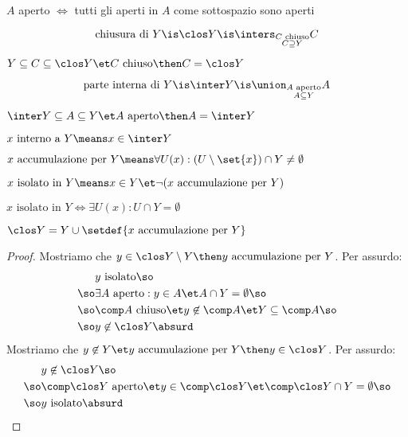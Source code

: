 \begin{prop}
$A$ aperto $\iff$ tutti gli aperti in $A$ come sottospazio sono aperti
\end{prop}

\begin{defn}
\[\text{chiusura di }Y\is\clos Y\is\inters_{\substack{C\text{ chiuso}\\C\supseteq Y}}C\]
\end{defn}

\begin{prop}
$Y\subseteq C\subseteq\clos Y\et C\text{ chiuso}\then C=\clos Y$
\end{prop}

\begin{defn}
\[\text{parte interna di }Y\is\inter Y\is\union_{\substack{A\text{ aperto}\\A\subseteq Y}}A\]
\end{defn}

\begin{prop}
$\inter Y\subseteq A\subseteq Y\et A\text{ aperto}\then A=\inter Y$
\end{prop}

\begin{defn}
$x\text{ interno a }Y\means x\in\inter Y$
\end{defn}

\begin{defn}
$x\text{ accumulazione per }Y\means\forall U(x):(U\setminus\set{x})\cap Y\neq\emptyset$
\end{defn}

\begin{defn}
$x\text{ isolato in }Y\means x\in Y\et\neg(x\text{ accumulazione per }Y)$
\end{defn}

\begin{prop}
$x\text{ isolato in }Y\iff\exists U(x):U\cap Y=\emptyset$
\end{prop}

\begin{lemma}
$\clos Y=Y\cup\setdef{x\text{ accumulazione per }Y}$
\end{lemma}
\begin{proof}
Mostriamo che $y\in\clos Y\setminus Y\then y\text{ accumulazione per }Y$. Per assurdo:
\begin{align*}
&y\text{ isolato}\so\\
\so&\exists A\text{ aperto}:y\in A\et A\cap Y=\emptyset\so\\
\so&\comp A\text{ chiuso}\et y\not\in\comp A\et Y\subseteq\comp A\so\\
\so&y\not\in\clos Y\absurd
\end{align*}
Mostriamo che $y\not\in Y\et y\text{ accumulazione per }Y\then y\in\clos Y$. Per assurdo:
\begin{align*}
&y\not\in\clos Y\so\\
\so&\comp\clos Y\text{ aperto}\et y\in\comp\clos Y\et\comp\clos Y\cap Y=\emptyset\so\\
\so&y\text{ isolato}\absurd
\end{align*}
\end{proof}

